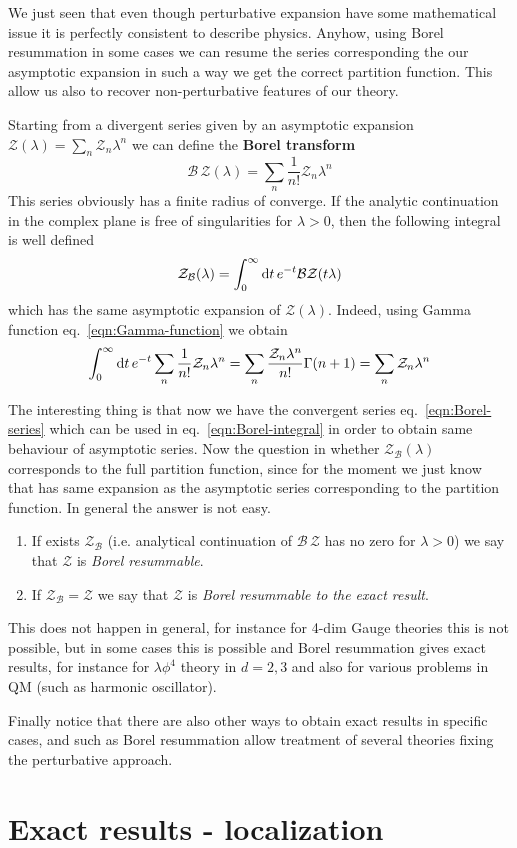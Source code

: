 \documentclass[../main/main.tex]{subfiles}
\begin{document}
We just seen that even though perturbative expansion have some mathematical issue it is perfectly consistent to describe physics. Anyhow, using Borel resummation in some cases we can resume the series corresponding the our asymptotic expansion in such a way we get the correct partition function. This allow us also to recover non-perturbative features of our theory. 

Starting from a divergent series given by an asymptotic expansion $\mathcal Z(\lambda)=\sum_n\mathcal Z_n\lambda^n$ we can define the \textbf{Borel transform} 
\begin{equation}\label{eqn:Borel-series}
\mathcal B\,\mathcal Z(\lambda)=\sum_n\frac1{n!}\mathcal Z_n\lambda^n
\end{equation}
This series obviously has a finite radius of converge. If the analytic continuation in the complex plane is free of singularities for $\lambda>0$, then the following integral is well defined
\begin{equation}\label{eqn:Borel-integral}
\mathcal Z_{\mathcal B}(\lambda)=\int_0^\infty\textup{d} t\, e^{-t}\mathcal B\mathcal Z(t\lambda)
\end{equation}
which has the same asymptotic expansion of $\mathcal Z(\lambda)$. Indeed, using Gamma function eq.~\eqref{eqn:Gamma-function} we obtain
\[\int_0^\infty\textup{d} t\, e^{-t}\sum_n\frac1{n!}\mathcal Z_n\lambda^n
=\sum_n\frac{\mathcal Z_n\lambda^n}{n!}\Gamma(n+1)=\sum_n\mathcal Z_n\lambda^n\]

The interesting thing is that now we have the convergent series eq.~\eqref{eqn:Borel-series} which can be used in eq.~\eqref{eqn:Borel-integral} in order to obtain same behaviour of asymptotic series.
Now the question in whether $\mathcal Z_{\mathcal B}(\lambda)$ corresponds to the full partition function, since for the moment we just know that has same expansion as the asymptotic series corresponding to the partition function. In general the answer is not easy. 
\begin{enumerate}[label=\textbullet]
\item If exists $\mathcal Z_{\mathcal B}$ (i.e. analytical continuation of $\mathcal B\,\mathcal Z$ has no zero for $\lambda>0$) we say that $\mathcal Z$ is \emph{Borel resummable}.
\item If $\mathcal Z_{\mathcal B}=\mathcal Z$ we say that $\mathcal Z$ is \emph{Borel resummable to the exact result}.
\end{enumerate}
This does not happen in general, for instance for 4-dim Gauge theories this is not possible, but in some cases this is possible and Borel resummation gives exact results, for instance for $\lambda\phi^4$ theory in $d=2,3$ and also for various problems in QM (such as harmonic oscillator). 

Finally notice that there are also other ways to obtain exact results in specific cases, and such as Borel resummation allow treatment of several theories fixing the perturbative approach. 

\section{Exact results - localization}
\end{document}
